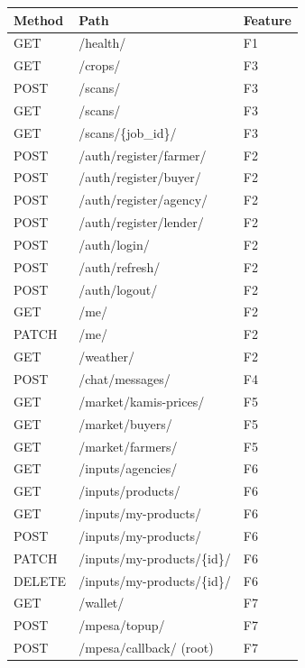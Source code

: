 \documentclass[11pt,a4paper]{article}
\begin{document}
\clearpage
\small
\begin{longtable}{@{} l p{} l @{}}
\toprule
\textbf{Method} & \textbf{Path} & \textbf{Feature} \\
\midrule
\endhead
GET  & /health/                      & F1 \\
GET  & /crops/                       & F3 \\
POST & /scans/                       & F3 \\
GET  & /scans/                       & F3 \\
GET  & /scans/\{job\_id\}/             & F3 \\
POST & /auth/register/farmer/        & F2 \\
POST & /auth/register/buyer/         & F2 \\
POST & /auth/register/agency/        & F2 \\
POST & /auth/register/lender/        & F2 \\
POST & /auth/login/                  & F2 \\
POST & /auth/refresh/                & F2 \\
POST & /auth/logout/                 & F2 \\
GET  & /me/                          & F2 \\
PATCH& /me/                          & F2 \\
GET  & /weather/                     & F2 \\
POST & /chat/messages/               & F4 \\
GET  & /market/kamis-prices/         & F5 \\
GET  & /market/buyers/               & F5 \\
GET  & /market/farmers/              & F5 \\
GET  & /inputs/agencies/             & F6 \\
GET  & /inputs/products/             & F6 \\
GET  & /inputs/my-products/          & F6 \\
POST & /inputs/my-products/          & F6 \\
PATCH& /inputs/my-products/\{id\}/     & F6 \\
DELETE& /inputs/my-products/\{id\}/    & F6 \\
GET  & /wallet/                      & F7 \\
POST & /mpesa/topup/                 & F7 \\
POST & /mpesa/callback/ (root)       & F7 \\

\end{longtable}
\end{document}
